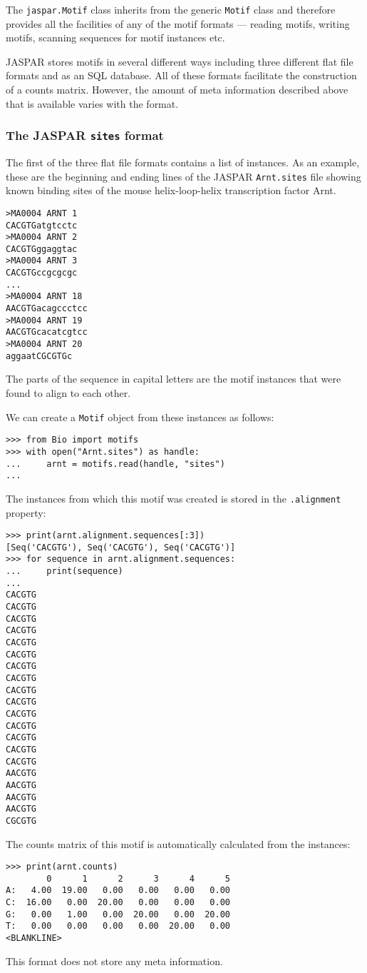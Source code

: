 The \verb+jaspar.Motif+ class inherits from the generic \verb+Motif+ class and therefore provides all the facilities of any of the motif formats --- reading motifs, writing motifs, scanning sequences for motif instances etc.

JASPAR stores motifs in several different ways including three different flat file formats and as an SQL database. All of these formats facilitate the construction of a counts matrix. However, the amount of meta information described above that is available varies with the format.

\subsubsection*{The JASPAR \texttt{sites} format}

The first of the three flat file formats contains a list of instances. As an example, these are the beginning and ending lines of the JASPAR \verb+Arnt.sites+ file showing known binding sites of the mouse helix-loop-helix transcription factor Arnt.
\begin{verbatim}
>MA0004 ARNT 1
CACGTGatgtcctc
>MA0004 ARNT 2
CACGTGggaggtac
>MA0004 ARNT 3
CACGTGccgcgcgc
...
>MA0004 ARNT 18
AACGTGacagccctcc
>MA0004 ARNT 19
AACGTGcacatcgtcc
>MA0004 ARNT 20
aggaatCGCGTGc
\end{verbatim}
The parts of the sequence in capital letters are the motif instances that were found to align to each other.

We can create a \verb+Motif+ object from these instances as follows:

\begin{verbatim}
>>> from Bio import motifs
>>> with open("Arnt.sites") as handle:
...     arnt = motifs.read(handle, "sites")
...
\end{verbatim}
The instances from which this motif was created is stored in the \verb+.alignment+ property:

\begin{verbatim}
>>> print(arnt.alignment.sequences[:3])
[Seq('CACGTG'), Seq('CACGTG'), Seq('CACGTG')]
>>> for sequence in arnt.alignment.sequences:
...     print(sequence)
...
CACGTG
CACGTG
CACGTG
CACGTG
CACGTG
CACGTG
CACGTG
CACGTG
CACGTG
CACGTG
CACGTG
CACGTG
CACGTG
CACGTG
CACGTG
AACGTG
AACGTG
AACGTG
AACGTG
CGCGTG
\end{verbatim}
The counts matrix of this motif is automatically calculated from the instances:

\begin{verbatim}
>>> print(arnt.counts)
        0      1      2      3      4      5
A:   4.00  19.00   0.00   0.00   0.00   0.00
C:  16.00   0.00  20.00   0.00   0.00   0.00
G:   0.00   1.00   0.00  20.00   0.00  20.00
T:   0.00   0.00   0.00   0.00  20.00   0.00
<BLANKLINE>
\end{verbatim}
This format does not store any meta information.

